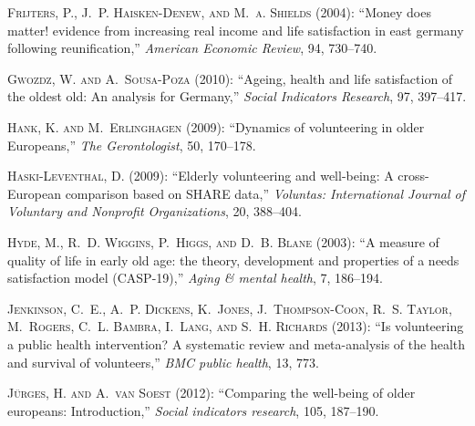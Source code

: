 \documentclass[10pt, letterpaper]{article}
\begin{document}
\begin{spacing}{1.4}
\begin{thebibliography}{71}
\textsc{Frijters, P., J.~P. Haisken-Denew, and M.~a. Shields} (2004):
  \enquote{{Money does matter! evidence from increasing real income and life
  satisfaction in east germany following reunification},} \emph{American
  Economic Review}, 94, 730--740.

\textsc{Gwozdz, W. and A.~Sousa-Poza} (2010): \enquote{Ageing, health and life
  satisfaction of the oldest old: An analysis for Germany,} \emph{Social
  Indicators Research}, 97, 397--417.

\textsc{Hank, K. and M.~Erlinghagen} (2009): \enquote{Dynamics of volunteering
  in older Europeans,} \emph{The Gerontologist}, 50, 170--178.

\textsc{Haski-Leventhal, D.} (2009): \enquote{Elderly volunteering and
  well-being: A cross-European comparison based on SHARE data,} \emph{Voluntas:
  International Journal of Voluntary and Nonprofit Organizations}, 20,
  388--404.

\textsc{Hyde, M., R.~D. Wiggins, P.~Higgs, and D.~B. Blane} (2003): \enquote{A
  measure of quality of life in early old age: the theory, development and
  properties of a needs satisfaction model (CASP-19),} \emph{Aging \& mental
  health}, 7, 186--194.

\textsc{Jenkinson, C.~E., A.~P. Dickens, K.~Jones, J.~Thompson-Coon, R.~S.
  Taylor, M.~Rogers, C.~L. Bambra, I.~Lang, and S.~H. Richards} (2013):
  \enquote{Is volunteering a public health intervention? A systematic review
  and meta-analysis of the health and survival of volunteers,} \emph{BMC public
  health}, 13, 773.

\textsc{J{\"u}rges, H. and A.~van Soest} (2012): \enquote{Comparing the
  well-being of older europeans: Introduction,} \emph{Social indicators
  research}, 105, 187--190.


\end{thebibliography}
\end{spacing}
\end{document}
